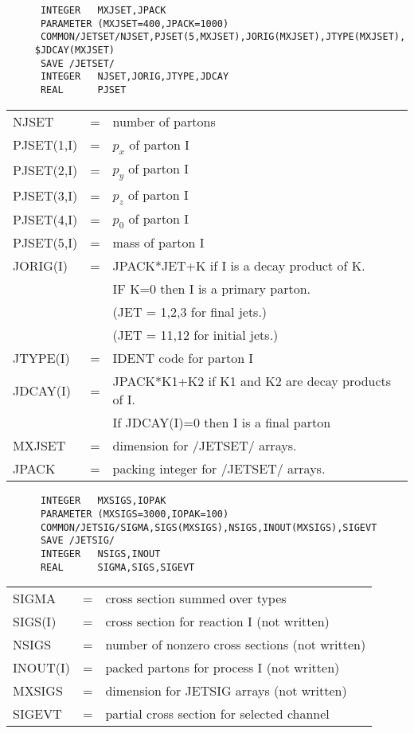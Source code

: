 \begin{verbatim}
      INTEGER   MXJSET,JPACK
      PARAMETER (MXJSET=400,JPACK=1000)
      COMMON/JETSET/NJSET,PJSET(5,MXJSET),JORIG(MXJSET),JTYPE(MXJSET),
     $JDCAY(MXJSET)
      SAVE /JETSET/
      INTEGER   NJSET,JORIG,JTYPE,JDCAY
      REAL      PJSET
\end{verbatim}
\begin{tabular}{lcl}
NJSET              &=& number of partons\\
PJSET(1,I)         &=& $p_x$ of parton I\\
PJSET(2,I)         &=& $p_y$ of parton I\\
PJSET(3,I)         &=& $p_z$ of parton I\\
PJSET(4,I)         &=& $p_0$ of parton I\\
PJSET(5,I)         &=& mass of parton I\\
JORIG(I)           &=& JPACK*JET+K if I is a decay product of K.\\
                   && IF K=0 then I is a primary parton.\\
                   && (JET = 1,2,3 for final jets.)\\
                   && (JET = 11,12 for initial jets.)\\
JTYPE(I)           &=& IDENT code for parton I\\
JDCAY(I)           &=& JPACK*K1+K2 if K1 and K2 are decay products of I.\\
                   &&  If JDCAY(I)=0 then I is a final parton\\
MXJSET             &=& dimension for /JETSET/ arrays.\\
JPACK              &=& packing integer for /JETSET/ arrays.\\
\end{tabular}

\begin{verbatim}
      INTEGER   MXSIGS,IOPAK
      PARAMETER (MXSIGS=3000,IOPAK=100)
      COMMON/JETSIG/SIGMA,SIGS(MXSIGS),NSIGS,INOUT(MXSIGS),SIGEVT
      SAVE /JETSIG/
      INTEGER   NSIGS,INOUT
      REAL      SIGMA,SIGS,SIGEVT
\end{verbatim}
\begin{tabular}{lcl}
SIGMA              &=& cross section summed over types\\
SIGS(I)            &=& cross section for reaction I (not written)\\
NSIGS              &=& number of nonzero cross sections (not written)\\
INOUT(I)           &=& packed partons for process I (not written)\\
MXSIGS             &=& dimension for JETSIG arrays (not written)\\
SIGEVT             &=& partial cross section for selected channel\\
\end{tabular}

